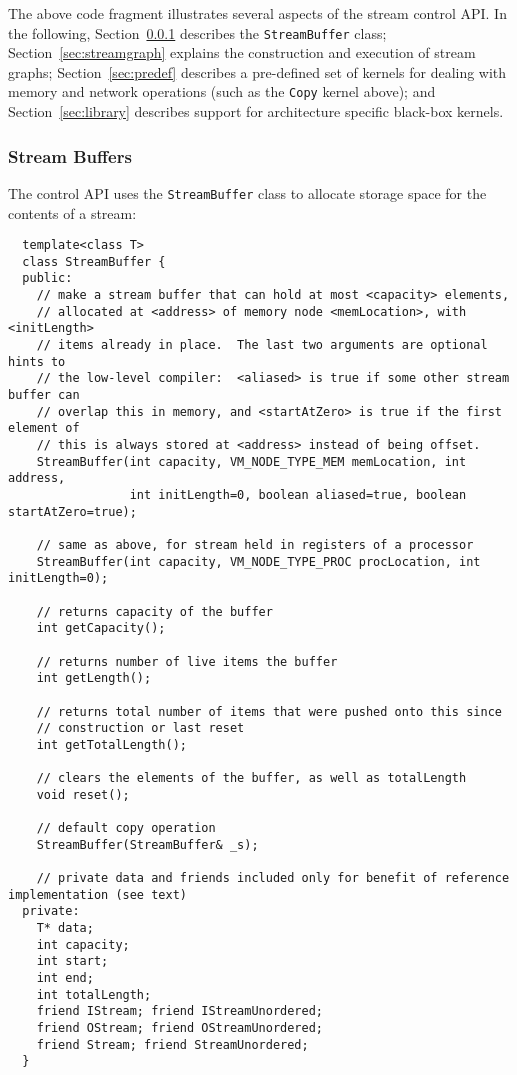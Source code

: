 The above code fragment illustrates several aspects of the stream
control API.  In the following, Section~\ref{sec:procstreams}
describes the {\tt StreamBuffer} class; Section~\ref{sec:streamgraph}
explains the construction and execution of stream graphs;
Section~\ref{sec:predef} describes a pre-defined set of kernels for
dealing with memory and network operations (such as the {\tt Copy}
kernel above); and Section~\ref{sec:library} describes support for
architecture specific black-box kernels.

\subsubsection{Stream Buffers}
\label{sec:procstreams}

The control API uses the {\tt StreamBuffer} class to allocate storage
space for the contents of a stream:
{\small
\begin{verbatim}
  template<class T>
  class StreamBuffer {
  public:
    // make a stream buffer that can hold at most <capacity> elements,
    // allocated at <address> of memory node <memLocation>, with <initLength>
    // items already in place.  The last two arguments are optional hints to
    // the low-level compiler:  <aliased> is true if some other stream buffer can
    // overlap this in memory, and <startAtZero> is true if the first element of
    // this is always stored at <address> instead of being offset.
    StreamBuffer(int capacity, VM_NODE_TYPE_MEM memLocation, int address, 
                 int initLength=0, boolean aliased=true, boolean startAtZero=true);

    // same as above, for stream held in registers of a processor
    StreamBuffer(int capacity, VM_NODE_TYPE_PROC procLocation, int initLength=0);

    // returns capacity of the buffer
    int getCapacity();

    // returns number of live items the buffer
    int getLength();

    // returns total number of items that were pushed onto this since
    // construction or last reset
    int getTotalLength();

    // clears the elements of the buffer, as well as totalLength
    void reset();

    // default copy operation
    StreamBuffer(StreamBuffer& _s);

    // private data and friends included only for benefit of reference implementation (see text)
  private:
    T* data;
    int capacity;
    int start;
    int end;
    int totalLength;
    friend IStream; friend IStreamUnordered;
    friend OStream; friend OStreamUnordered;
    friend Stream; friend StreamUnordered;
  }
\end{verbatim}}


